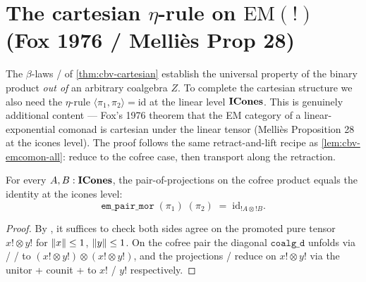 \section{The cartesian \texorpdfstring{$\eta$}{eta}-rule on
\texorpdfstring{$\mathrm{EM}(\mathord{!})$}{EM(!)} (Fox 1976 /
Melli\`es Prop 28)}\label{sec:cbv-cart-eta}

The $\beta$-laws  /
 of
\autoref{thm:cbv-cartesian} establish the universal property of the
binary product \emph{out of} an arbitrary coalgebra $Z$. To complete the
cartesian structure we also need the $\eta$-rule
$\langle \pi_1, \pi_2 \rangle = \mathrm{id}$ at the linear level
$\mathbf{ICones}$. This is genuinely additional content --- Fox's 1976 theorem
that the EM category of a linear-exponential comonad is cartesian
under the linear tensor (Melli\`es Proposition 28 at the icones
level). The proof follows the same retract-and-lift recipe as
\autoref{lem:cbv-emcomon-all}: reduce to the cofree case, then transport
along the retraction.

\begin{lemma}\label{lem:cbv-cart-eta-cofree}
\rocqok
{}
For every $A, B : \mathbf{ICones}$, the pair-of-projections on the cofree
product equals the identity at the icones level:
\[
  \mathtt{em\_pair\_mor}\;(\pi_1)\;(\pi_2)
  \;=\;
  \mathrm{id}_{\mathord{!}A \otimes \mathord{!}B}.
\]
\end{lemma}

\begin{proof}
By , it suffices
to check both sides agree on the promoted pure tensor $x! \otimes y!$
for $\lVert x \rVert \leq 1$, $\lVert y \rVert \leq 1$. On the cofree pair the
diagonal $\mathtt{coalg\_d}$ unfolds via
 /
 /
 to
$(x! \otimes y!) \otimes (x! \otimes y!)$, and the projections
 /
 reduce on
$x! \otimes y!$ via the unitor + counit + 
to $x!$ / $y!$ respectively.
\end{proof}

